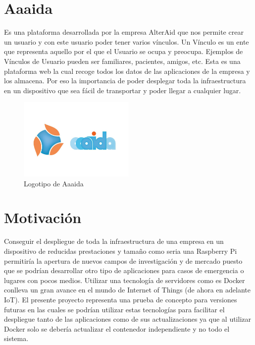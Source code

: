 \section{Aaaida}
Es una plataforma desarrollada por la empresa AlterAid que nos permite crear un usuario y con este usuario poder tener varios vínculos. Un Vínculo es un ente que representa aquello por el que el Usuario se ocupa y preocupa. Ejemplos de Vínculos de Usuario pueden ser familiares, pacientes, amigos, etc. 
Esta es una plataforma web la cual recoge todos los datos de las aplicaciones de la empresa y los almacena. Por eso la importancia de poder desplegar toda la infraestructura en un dispositivo que sea fácil de transportar y poder llegar a cualquier lugar.
\newpage
\begin{figure}[htb]
\begin{center}
\includegraphics[width=0.5\textwidth]{./setup/aaaidaLogo}
\caption{Logotipo de Aaaida}
\label{F:prova}
\end{center}
\end{figure}





\section{Motivación}

Conseguir el despliegue de toda la infraestructura de una empresa en un dispositivo de reducidas prestaciones y tamaño como seria una Raspberry Pi permitiría la apertura de nuevos campos de investigación y de mercado puesto que se podrían desarrollar otro tipo de aplicaciones para casos de emergencia o lugares con pocos medios. 
Utilizar una tecnología de servidores como es Docker conlleva un gran avance en el mundo de Internet of Things (de ahora en adelante IoT).
El presente proyecto representa una prueba de concepto para versiones futuras en las cuales se podrían utilizar estas tecnologías para facilitar el despliegue tanto de las aplicaciones como de sus actualizaciones ya que al utilizar Docker solo se debería actualizar el contenedor independiente y no todo el sistema.
